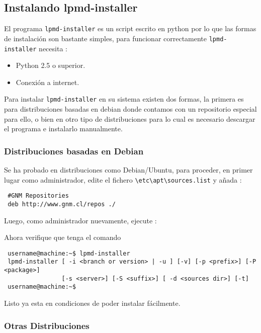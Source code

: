 \subsection{Instalando lpmd-installer}

El programa \verb|lpmd-installer| es un script escrito en python por lo que las formas de instalaci\'on son bastante simples, para funcionar correctamente \verb|lpmd-installer| necesita :

\begin{itemize}
\item Python 2.5 o superior.
\item Conexi\'on a internet.
\end{itemize}

Para instalar \verb|lpmd-installer| en su sistema existen dos formas, la primera es para distribuciones basadas en debian donde contamos con un repositorio especial para ello, o bien en otro tipo de distribuciones para lo cual es necesario descargar el programa e instalarlo manualmente.

\subsubsection{Distribuciones basadas en Debian}

Se ha probado en distribuciones como Debian/Ubuntu, para proceder, en primer lugar como administrador, edite el fichero \verb|\etc\apt\sources.list| y a\~nada :

\begin{verbatim}
 #GNM Repositories
 deb http://www.gnm.cl/repos ./
\end{verbatim}

Luego, como administrador nuevamente, ejecute :

Ahora verifique que tenga el comando
\begin{verbatim}
 username@machine:~$ lpmd-installer 
 lpmd-installer [ -i <branch or version> | -u ] [-v] [-p <prefix>] [-P <package>] 
                [-s <server>] [-S <suffix>] [ -d <sources dir>] [-t]
 username@machine:~$
\end{verbatim}

Listo ya esta en condiciones de poder instalar {\lpmd} f\'acilmente.

\subsubsection{Otras Distribuciones}

